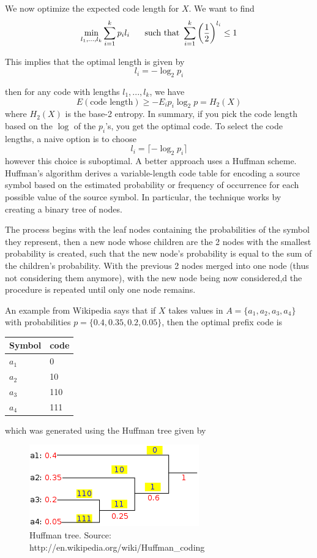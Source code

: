 We now optimize the expected code length for $X$. We want to find
$$\min_{l_1, ..., l_k} \sum_{i = 1}^k p_i l_i \hspace{5mm} \text{ such that } \sum_{i = 1}^k \left(\frac12\right)^{l_i} \leq 1$$

This implies that the optimal length is given by
$$l_i = - \log_2 p_i$$

then for any code with lengths $l_1, ..., l_k$, we have
$$E (\text{code length}) \geq - E_i p_i \log_2 p = H_2(X)$$
where $H_2(X)$ is the base-2 entropy. In summary, if you pick the code length based on the $\log$ of the $p_i$'s, you get the optimal code. To select the code lengths, a naive option is to choose
$$l_i = \lceil - \log_2 p_i \rceil$$
however this choice is suboptimal. A better approach uses a Huffman scheme. Huffman's algorithm derives a variable-length code table for encoding a source symbol based on the estimated probability or frequency of occurrence for each possible value of the source symbol. In particular, the technique works by creating a binary tree of nodes.

The process begins with the leaf nodes containing the probabilities of the symbol they represent, then a new node whose children are the 2 nodes with the smallest probability is created, such that the new node's probability is equal to the sum of the children's probability. With the previous 2 nodes merged into one node (thus not considering them anymore), with the new node being now considered,d the procedure is repeated until only one node remains. 

An example from Wikipedia says that if $X$ takes values in $A = \{a_1, a_2, a_3, a_4\}$ with probabilities $p = \{ 0.4, 0.35, 0.2, 0.05\}$, then the optimal prefix code is 
\begin{center}
\begin{tabular}{l|l}
Symbol & code \\ \hline
$a_1$ & 0\\
$a_2$ & 10\\
$a_3$ & 110\\
$a_4$ & 111
\end{tabular}
\end{center}

which was generated using the Huffman tree given by
\begin{figure}[H]
\centering
\includegraphics{Huffman.png}
\caption{Huffman tree. Source: http://en.wikipedia.org/wiki/Huffman\_coding}
\end{figure}


